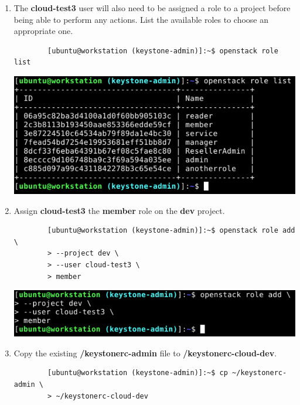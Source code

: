 \documentclass[letterpaper, 12pt]{article}
\begin{document}
\begin{enumerate}
    \item The \textbf{cloud-test3} user will also need to be assigned a role to a project before being able to perform
    any actions. List the available roles to choose an appropriate one.
    \begin{lstlisting}
        [ubuntu@workstation (keystone-admin)]:~$ openstack role list
    \end{lstlisting}

    \begin{center}
        \includegraphics[width=\linewidth]{images/part4/step6.png}
    \end{center}

    \item  Assign \textbf{cloud-test3} the \textbf{member} role on the \textbf{dev} project.
    \begin{lstlisting}
        [ubuntu@workstation (keystone-admin)]:~$ openstack role add \
        > --project dev \
        > --user cloud-test3 \
        > member
    \end{lstlisting}

    \begin{center}
        \includegraphics[width=\linewidth]{images/part4/step7.png}
    \end{center}

    \item Copy the existing \textbf{\texttildemid/keystonerc-admin} file to \textbf{\texttildemid/keystonerc-cloud-dev}.
    \label{it:copy_keystone}
    \begin{lstlisting}
        [ubuntu@workstation (keystone-admin)]:~$ cp ~/keystonerc-admin \
        > ~/keystonerc-cloud-dev
    \end{lstlisting}


\end{enumerate}
\end{document}
